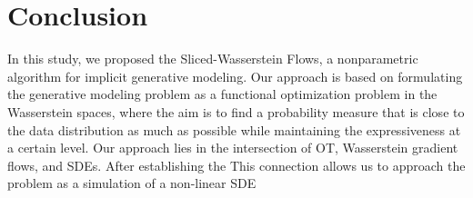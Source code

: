 
\section{Conclusion}

In this study, we proposed the Sliced-Wasserstein Flows, a nonparametric algorithm for implicit generative modeling. Our approach is based on formulating the generative modeling problem as a functional optimization problem in the Wasserstein spaces, where the aim is to find a probability measure that is close to the data  distribution as much as possible while maintaining the expressiveness at a certain level. Our approach lies in the intersection of OT, Wasserstein gradient flows, and SDEs. After establishing the  This connection allows us to approach the problem as a simulation of a non-linear SDE

